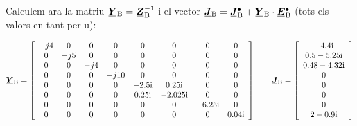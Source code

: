 \begin{exemple}
    Calculem ara la matriu $\mcmplx{Y}\ped{B}=\mcmplx{Z}\ped{B}^{-1}$ i el vector $\mcmplx{J}\ped{B} = \mcmplx{J}\ped{B}^\bullet + \mcmplx{Y}\ped{B} \cdot\mcmplx{E}\ped{B}^\bullet$  (tots els valors en tant per u):

    \[
       \mcmplx{Y}\ped{B} =
       \begin{bmatrix}\begin{array}{cccccccc}
         -j 4 & 0 & 0 & 0 & 0 & 0 & 0 & 0 \\
         0 & -j 5 & 0 & 0 & 0 & 0 & 0 & 0 \\
         0 & 0 & -j 4 & 0 & 0 & 0 & 0 & 0 \\
         0 & 0 & 0 & -j 10 & 0 & 0 & 0 & 0 \\
         0 & 0 & 0 & 0 & \complexnum{-j 2,5} & \complexnum{j 0,25} & 0 & 0 \\
         0 & 0 & 0 & 0 & \complexnum{j 0,25} & \complexnum{-j 2,025} & 0 & 0 \\
         0 & 0 & 0 & 0 & 0 & 0 & \complexnum{-j 6,25} & 0 \\
         0 & 0 & 0 & 0 & 0 & 0 & 0 & \complexnum{j 0,04}
    \end{array}\end{bmatrix}
       \qquad
       \mcmplx{J}\ped{B} =
       \begin{bmatrix}\begin{array}{c}
        \complexnum{-j 4,4} \\
        \complexnum{0,5 - j 5,25} \\
        \complexnum{0,48 - j 4,32} \\
        0 \\
        0 \\
        0 \\
        0 \\
        \complexnum{2 - j 0,9}
    \end{array}\end{bmatrix}
    \]


\end{exemple}
